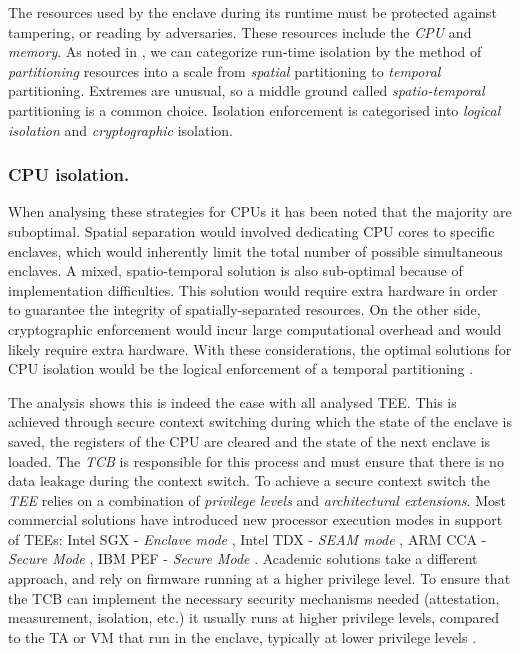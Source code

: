 \documentclass[runningheads,a4paper]{uwsese}
\begin{document}
The resources used by the enclave during its runtime must be protected against
tampering, or reading by adversaries. These resources include the \emph{CPU}
and \emph{memory}. As noted in \cite{tee_hw_sup}, we can categorize
run-time isolation by the method of \emph{partitioning} resources into a scale
from \emph{spatial} partitioning to \emph{temporal} partitioning. Extremes are
unusual, so a middle ground called \emph{spatio-temporal} partitioning is a
common choice. Isolation enforcement is categorised into \emph{logical
isolation} and \emph{cryptographic} isolation.

\subsubsection{CPU isolation.}

When analysing these strategies for \glspl{CPU} it has been noted that the
majority are suboptimal. Spatial separation would involved dedicating \gls{CPU}
cores to specific enclaves, which would inherently limit the total number of
possible simultaneous enclaves. A mixed, spatio-temporal solution is also
sub-optimal because of implementation difficulties. This solution would require
extra hardware in order to guarantee the integrity of spatially-separated
resources. On the other side, cryptographic enforcement would incur large
computational overhead and would likely require extra hardware. With these
considerations, the optimal solutions for \gls{CPU} isolation would be the
logical enforcement of a temporal partitioning \cite{tee_hw_sup}.

The analysis shows this is indeed the case with all analysed \gls{TEE}. This is
achieved through secure context switching during which the state of the enclave
is saved, the registers of the \gls{CPU} are cleared and the state of the next
enclave is loaded. The \emph{\gls{TCB}} is responsible for this process and
must ensure that there is no data leakage during the context switch. To achieve
a secure context switch the \emph{\gls{TEE}} relies on a combination of
\emph{privilege levels} and \emph{architectural extensions}. Most commercial
solutions have introduced new processor execution modes in support of
\glspl{TEE}: Intel SGX - \emph{Enclave mode} \cite{intel_sgx}, Intel TDX -
\emph{SEAM mode} \cite{intel_tdx}, ARM CCA - \emph{Secure Mode} \cite{arm_cca},
IBM PEF - \emph{Secure Mode} \cite{ibm_pef}. Academic solutions take a
different approach, and rely on firmware running at a higher privilege level.
To ensure that the \gls{TCB} can implement the necessary security mechanisms
needed (attestation, measurement, isolation, etc.) it usually runs at higher
privilege levels, compared to the \gls{TA} or \gls{VM} that run in the enclave,
typically at lower privilege levels \cite{tee_hw_sup}. 
\end{document}
